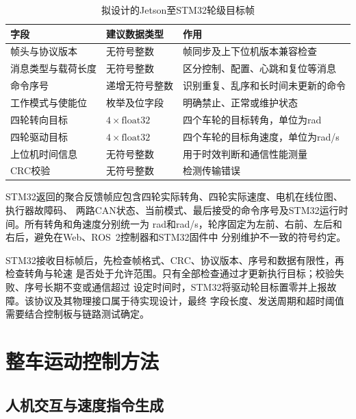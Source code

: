 \begin{table}[htbp]
    \centering
    \caption{拟设计的Jetson至STM32轮级目标帧}
    \label{tab:web-command-frame}
    \begin{tabularx}{\textwidth}{p{3.2cm}p{3.0cm}X}
        \toprule
        字段 & 建议数据类型 & 作用 \\
        \midrule
        帧头与协议版本 & 无符号整数 & 帧同步及上下位机版本兼容检查 \\
        消息类型与载荷长度 & 无符号整数 & 区分控制、配置、心跳和复位等消息 \\
        命令序号 & 递增无符号整数 & 识别重复、乱序和长时间未更新的命令 \\
        工作模式与使能位 & 枚举及位字段 & 明确禁止、正常或维护状态 \\
        四轮转向目标 & $4\times\mathrm{float32}$ & 四个车轮的目标转角，单位为rad \\
        四轮驱动目标 & $4\times\mathrm{float32}$ & 四个车轮的目标角速度，单位为rad/s \\
        上位机时间信息 & 无符号整数 & 用于时效判断和通信性能测量 \\
        CRC校验 & 无符号整数 & 检测传输错误 \\
        \bottomrule
    \end{tabularx}
\end{table}

STM32返回的聚合反馈帧应包含四轮实际转角、四轮实际速度、电机在线位图、执行器故障码、
两路CAN状态、当前模式、最后接受的命令序号及STM32运行时间。所有转角和角速度分别统一为
rad和rad/s，轮序固定为左前、右前、左后和右后，避免在Web、ROS~2控制器和STM32固件中
分别维护不一致的符号约定。

STM32接收目标帧后，先检查帧格式、CRC、协议版本、序号和数据有限性，再检查转角与轮速
是否处于允许范围。只有全部检查通过才更新执行目标；校验失败、序号长期不变或通信超过
设定时间时，STM32将驱动轮目标置零并上报故障。该协议及其物理接口属于待实现设计，最终
字段长度、发送周期和超时阈值需要结合控制板与链路测试确定。

\section{整车运动控制方法}

\subsection{人机交互与速度指令生成}

